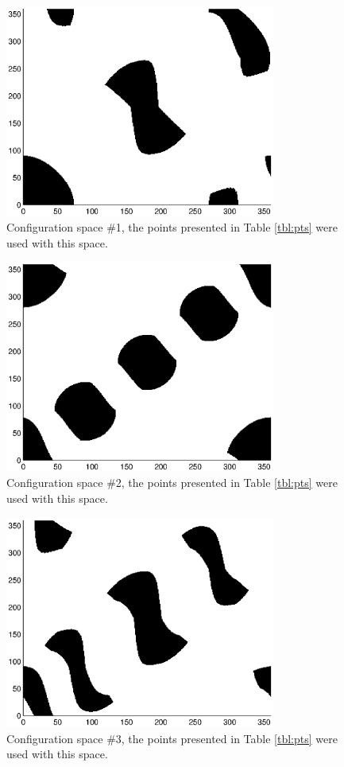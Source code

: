 \begin{figure}[ht]
\label{cs1}
	\centering
	\includegraphics[width=3.5in]{./figures/cspace2.eps}
	\caption{Configuration space \#1, the points presented in Table \ref{tbl:pts} were used with this space.}
	\label{fig:space1}
\end{figure}

\begin{figure}[ht]
\label{cs2}
	\centering
	\includegraphics[width=3.5in]{./figures/cspace3.eps}
	\caption{Configuration space \#2, the points presented in Table \ref{tbl:pts} were used with this space.}
	\label{fig:space2}
\end{figure}

\begin{figure}[ht]
\label{cs3}
	\centering
	\includegraphics[width=3.5in]{./figures/cspace4.eps}
	\caption{Configuration space \#3, the points presented in Table \ref{tbl:pts} were used with this space.}
	\label{fig:space3}
\end{figure}